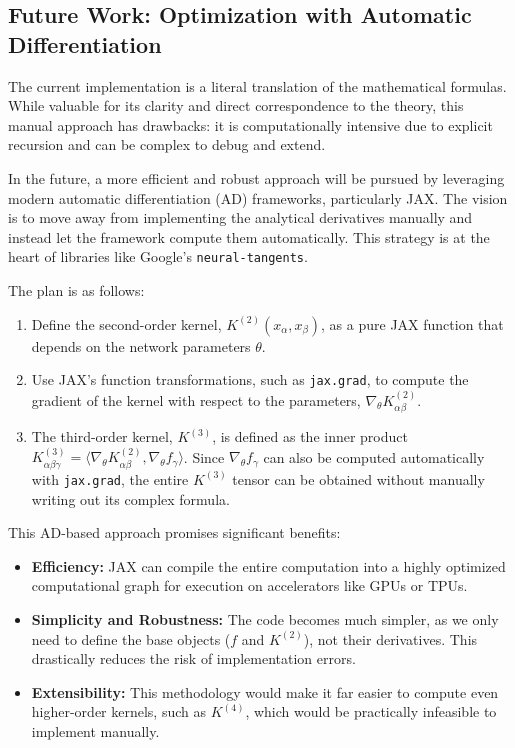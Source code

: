 \documentclass[11pt,a4paper]{article}
\begin{document}
\subsection{Future Work: Optimization with Automatic Differentiation}

The current implementation is a literal translation of the mathematical formulas. While valuable for its clarity and direct correspondence to the theory, this manual approach has drawbacks: it is computationally intensive due to explicit recursion and can be complex to debug and extend.

In the future, a more efficient and robust approach will be pursued by leveraging modern automatic differentiation (AD) frameworks, particularly JAX. The vision is to move away from implementing the analytical derivatives manually and instead let the framework compute them automatically. This strategy is at the heart of libraries like Google's \texttt{neural-tangents}.

The plan is as follows:
\begin{enumerate}
    \item Define the second-order kernel, $K^{(2)}(x_\alpha, x_\beta)$, as a pure JAX function that depends on the network parameters $\theta$.
    \item Use JAX's function transformations, such as \texttt{jax.grad}, to compute the gradient of the kernel with respect to the parameters, $\nabla_\theta K^{(2)}_{\alpha\beta}$.
    \item The third-order kernel, $K^{(3)}$, is defined as the inner product $K^{(3)}_{\alpha\beta\gamma} = \langle \nabla_\theta K^{(2)}_{\alpha\beta}, \nabla_\theta f_\gamma \rangle$. Since $\nabla_\theta f_\gamma$ can also be computed automatically with \texttt{jax.grad}, the entire $K^{(3)}$ tensor can be obtained without manually writing out its complex formula.
\end{enumerate}

This AD-based approach promises significant benefits:
\begin{itemize}
    \item \textbf{Efficiency:} JAX can compile the entire computation into a highly optimized computational graph for execution on accelerators like GPUs or TPUs.
    \item \textbf{Simplicity and Robustness:} The code becomes much simpler, as we only need to define the base objects ($f$ and $K^{(2)}$), not their derivatives. This drastically reduces the risk of implementation errors.
    \item \textbf{Extensibility:} This methodology would make it far easier to compute even higher-order kernels, such as $K^{(4)}$, which would be practically infeasible to implement manually.
\end{itemize}
\end{document}
